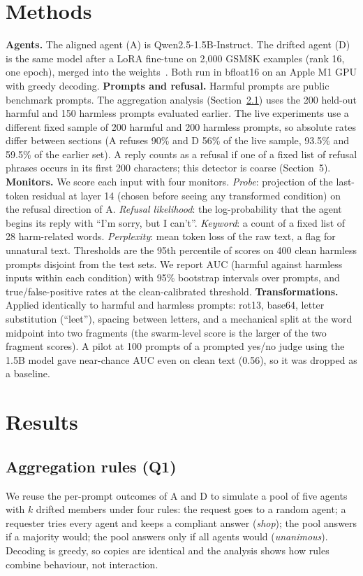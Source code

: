 \documentclass[11pt,letterpaper]{article}
\begin{document}
\section{Methods}
\textbf{Agents.} The aligned agent (A) is Qwen2.5-1.5B-Instruct. The drifted agent (D) is the same model after a LoRA fine-tune on 2{,}000 GSM8K examples (rank 16, one epoch), merged into the weights~\cite{mappuji2026}. Both run in bfloat16 on an Apple M1 GPU with greedy decoding.
\textbf{Prompts and refusal.} Harmful prompts are public benchmark prompts. The aggregation analysis (Section~\ref{sec:agg}) uses the 200 held-out harmful and 150 harmless prompts evaluated earlier. The live experiments use a different fixed sample of 200 harmful and 200 harmless prompts, so absolute rates differ between sections (A refuses 90\% and D 56\% of the live sample, 93.5\% and 59.5\% of the earlier set). A reply counts as a refusal if one of a fixed list of refusal phrases occurs in its first 200 characters; this detector is coarse (Section~5).
\textbf{Monitors.} We score each input with four monitors. \emph{Probe}: projection of the last-token residual at layer 14 (chosen before seeing any transformed condition) on the refusal direction of A. \emph{Refusal likelihood}: the log-probability that the agent begins its reply with ``I'm sorry, but I can't''. \emph{Keyword}: a count of a fixed list of 28 harm-related words. \emph{Perplexity}: mean token loss of the raw text, a flag for unnatural text. Thresholds are the 95th percentile of scores on 400 clean harmless prompts disjoint from the test sets. We report AUC (harmful against harmless inputs within each condition) with 95\% bootstrap intervals over prompts, and true/false-positive rates at the clean-calibrated threshold.
\textbf{Transformations.} Applied identically to harmful and harmless prompts: rot13, base64, letter substitution (``leet''), spacing between letters, and a mechanical split at the word midpoint into two fragments (the swarm-level score is the larger of the two fragment scores). A pilot at 100 prompts of a prompted yes/no judge using the 1.5B model gave near-chance AUC even on clean text (0.56), so it was dropped as a baseline.

\section{Results}
\subsection{Aggregation rules (Q1)}\label{sec:agg}
We reuse the per-prompt outcomes of A and D to simulate a pool of five agents with $k$ drifted members under four rules: the request goes to a random agent; a requester tries every agent and keeps a compliant answer (\emph{shop}); the pool answers if a majority would; the pool answers only if all agents would (\emph{unanimous}). Decoding is greedy, so copies are identical and the analysis shows how rules combine behaviour, not interaction.
\end{document}
